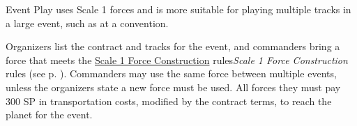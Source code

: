 Event Play uses Scale 1 forces and is more suitable for playing multiple tracks in a large event, such as at a convention.

Organizers list the contract and tracks for the event, and commanders bring a force that meets the  {\hyperref[subsec:force_construction_scale_1]{Scale 1 Force Construction} rules}{\emph{Scale 1 Force Construction} rules (see p. \pageref{subsec:force_construction_scale_1})}.
Commanders may use the same force between multiple events, unless the organizers state a new force must be used.
All forces they must pay 300 SP in transportation costs, modified by the contract terms, to reach the planet for the event.
